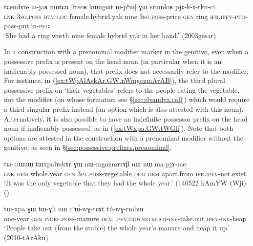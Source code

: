 \begin{exe}
\ex \label{ex:ftsoR.kWngWt.WphW}
\gll tɕendɤre ɯ-jaʁ nɯtɕu [ftsoʁ kɯngɯt ɯ-pʰɯ] ɣɯ srɯnloʁ pjɤ-k-ɤ-rku-ci \\
\textsc{lnk} \textsc{3sg}.\textsc{poss} \textsc{dem}:\textsc{loc} female.hybrid.yak nine \textsc{3sg}.\textsc{poss}-price \textsc{gen} ring \textsc{ifr}.\textsc{ipfv}-\textsc{peg}-pass-put.in-\textsc{peg} \\
\glt `She had a ring worth nine female hybrid yak in her hand.' (2003gesar)
\end{exe}

In a construction with a prenominal modifier marker in the genitive, even when a possessive prefix is present on the head noun (in particular when it is an inalienably possessed noun), that prefix does not necessarily refer to the modifier. For instance, in (\ref{ex:tWpAlAskAr.GW.nWmgozmArAB}), the third plural possessive prefix  on  `their vegetables' refers to the people eating the vegetable, not  the modifier  (on whose formation see §\ref{sec:dvandva.coll}) which would require a third singular prefix instead (an option which is also attested with this noun). Alternatively, it is also possible to have an indefinite possessor prefix on the head noun if inalienably possessed, as in (\ref{ex:tWxpa.GW.tWGli}). Note that both options are attested in the construction with a prenominal modifier without the genitive, as seen in §\ref{sec:possessive.prefixes.prenominal}.
 
 \begin{exe}
\ex \label{ex:tWpAlAskAr.GW.nWmgozmArAB}
\gll  tɕe nɯnɯ tɯxpalɤskɤr ɣɯ nɯ-mgozmɤrɤβ nɯ nɯ ma pjɤ-me.  \\
\textsc{lnk} \textsc{dem} whole.year \textsc{gen} \textsc{3pl}.\textsc{poss}-vegetable \textsc{dem} \textsc{dem} apart.from \textsc{ifr}.\textsc{ipfv}-not.exist \\
\glt `It was the only vegetable that they had the whole year.'  (140522 kAmYW tWji)
()
\end{exe}

\begin{exe}
\ex \label{ex:tWxpa.GW.tWGli}
\gll  tɯ-xpa ɣɯ tɯ-ɣli nɯ cʰɯ́-wɣ-tɕɤt tú-wɣ-rmbɯ  \\
one-year \textsc{gen} \textsc{indef}.\textsc{poss}-manure \textsc{dem} \textsc{ipfv}:\textsc{downstream}-\textsc{inv}-take.out \textsc{ipfv}-\textsc{inv}-heap \\
\glt `People take out (from the stable) the whole year's manure and heap it up.' (2010-tArAku)
\end{exe}

